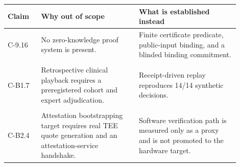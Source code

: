 \documentclass[11pt]{article}
\begin{document}
\small
\begin{longtable}{>{\RaggedRight\arraybackslash}p{0.13\linewidth} >{\RaggedRight\arraybackslash}p{0.38\linewidth} >{\RaggedRight\arraybackslash}p{0.39\linewidth}}
\toprule
Claim & Why out of scope & What is established instead\\
\midrule
C-9.16 & No zero-knowledge proof system is present. & Finite certificate predicate, public-input binding, and a blinded binding commitment.\\[0.6em]  \vspace{-0.4em} \\
C-B1.7 & Retrospective clinical playback requires a preregistered cohort and expert adjudication. & Receipt-driven replay reproduces 14/14 synthetic decisions.\\[0.6em]  \vspace{-0.4em} \\
C-B2.4 & Attestation bootstrapping target requires real TEE quote generation and an attestation-service handshake. & Software verification path is measured only as a proxy and is not promoted to the hardware target.\\
\bottomrule
\end{longtable}
\end{document}
